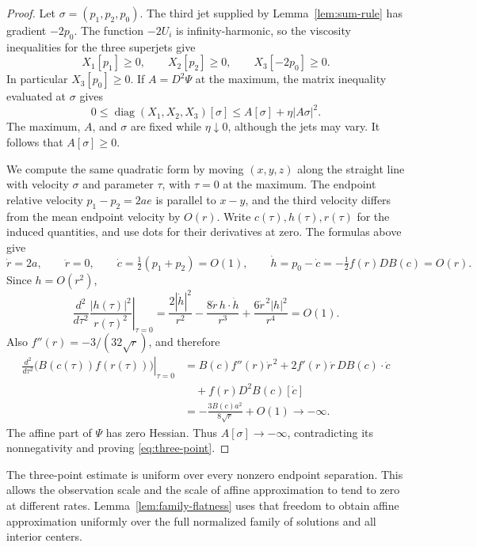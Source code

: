 \begin{proof}
Let $\sigma=(p_1,p_2,p_0)$. The third jet supplied by Lemma~\ref{lem:sum-rule} has gradient $-2p_0$. The function $-2U_i$ is infinity-harmonic, so the viscosity inequalities for the three superjets give
\[
  X_1[p_1]\ge0,\qquad X_2[p_2]\ge0,\qquad X_3[-2p_0]\ge0.
\]
In particular $X_3[p_0]\ge0$. If $A=D^2\Psi$ at the maximum, the matrix inequality evaluated at $\sigma$ gives
\[
  0\le\operatorname{diag}(X_1,X_2,X_3)[\sigma]
       \le A[\sigma]+\eta|A\sigma|^2.
\]
The maximum, $A$, and $\sigma$ are fixed while $\eta\downarrow0$, although the jets may vary. It follows that $A[\sigma]\ge0$.

We compute the same quadratic form by moving $(x,y,z)$ along the straight line with velocity $\sigma$ and parameter $\tau$, with $\tau=0$ at the maximum. The endpoint relative velocity $p_1-p_2=2ae$ is parallel to $x-y$, and the third velocity differs from the mean endpoint velocity by $O(r)$. Write $c(\tau),h(\tau),r(\tau)$ for the induced quantities, and use dots for their derivatives at zero. The formulas above give
\[
  \dot r=2a,\qquad \ddot r=0,\qquad
  \dot c=\tfrac12(p_1+p_2)=O(1),\qquad
  \dot h=p_0-\dot c=-\tfrac12f(r)DB(c)=O(r).
\]
Since $h=O(r^2)$,
\[
  \left.\frac{d^2}{d\tau^2}\frac{|h(\tau)|^2}{r(\tau)^2}\right|_{\tau=0}
  =\frac{2|\dot h|^2}{r^2}
   -\frac{8\dot r\,h\cdot\dot h}{r^3}
   +\frac{6\dot r^{\,2}|h|^2}{r^4}=O(1).
\]
Also $f''(r)=-3/(32\sqrt r)$, and therefore
\begin{align*}
  \left.\frac{d^2}{d\tau^2}\bigl(B(c(\tau))f(r(\tau))\bigr)\right|_{\tau=0}
  &=B(c)f''(r)\dot r^{\,2}+2f'(r)\dot r\,DB(c)\cdot\dot c\\
  &\quad+f(r)D^2B(c)[\dot c]\\
  &=-\frac{3B(c)a^2}{8\sqrt r}+O(1)\longrightarrow-\infty.
\end{align*}
The affine part of $\Psi$ has zero Hessian. Thus $A[\sigma]\to-\infty$, contradicting its nonnegativity and proving \eqref{eq:three-point}.
\end{proof}

The three-point estimate is uniform over every nonzero endpoint separation.
This allows the observation scale and the scale of affine approximation
to tend to zero at different rates. Lemma~\ref{lem:family-flatness} uses
that freedom to obtain affine approximation uniformly over the full
normalized family of solutions and all interior centers.
